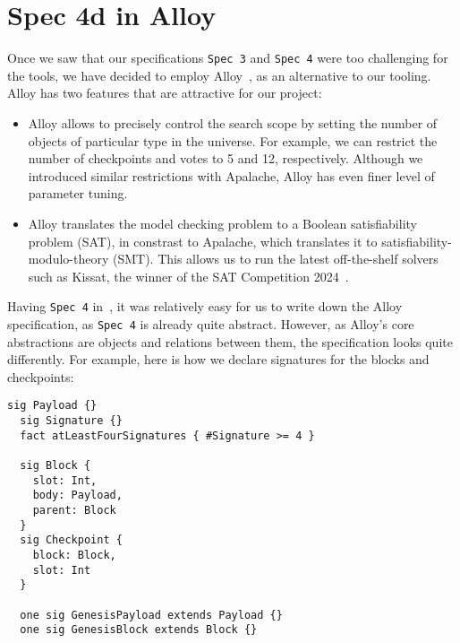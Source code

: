 
\section{Spec 4d in Alloy}

Once we saw that our specifications \texttt{Spec 3} and \texttt{Spec 4}
were too challenging for the \tlap{} tools, we have decided to employ
Alloy~\cite{jackson2012software,alloytools}, as an alternative to our tooling.
Alloy has two features that are attractive for our project:

\begin{itemize}

  \item Alloy allows to precisely control the search scope by setting the
      number of objects of particular type in the universe. For example, we can
      restrict the number of checkpoints and votes to 5 and 12, respectively.
      Although we introduced similar restrictions with Apalache, Alloy has even
      finer level of parameter tuning.

  \item Alloy translates the model checking problem to a Boolean satisfiability
      problem (SAT), in constrast to Apalache, which translates it to satisfiability-modulo-theory (SMT).  This
      allows us to run the latest off-the-shelf solvers such as Kissat, the
      winner of the SAT Competition 2024~\cite{SAT-Competition-2024-solvers}.

\end{itemize}

Having \texttt{Spec 4} in~\tlap{}, it was relatively easy for us to write down
the Alloy specification, as \texttt{Spec 4} is already quite abstract. However, as
Alloy's core abstractions are objects and relations between them, the
specification looks quite differently. For example, here is how we declare
signatures for the blocks and checkpoints:

\begin{lstlisting}[language=alloy,columns=fullflexible]
  sig Payload {}
  sig Signature {}
  fact atLeastFourSignatures { #Signature >= 4 }

  sig Block {
    slot: Int,
    body: Payload,
    parent: Block
  }
  sig Checkpoint {
    block: Block,
    slot: Int
  }

  one sig GenesisPayload extends Payload {}
  one sig GenesisBlock extends Block {}
\end{lstlisting}

